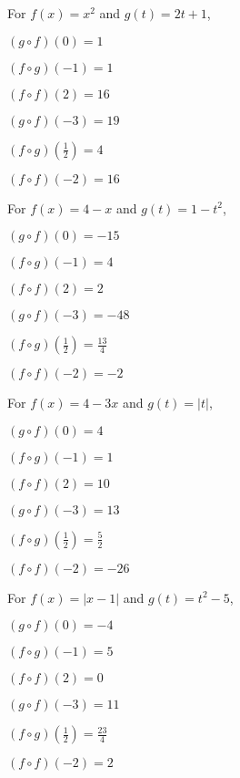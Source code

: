 \begin{exenum}

\item  For  $f(x) = x^2$ and $g(t) = 2t+1$,
\begin{shortitemize}[MMMMMMMMMMM]
\item  $(g\circ f)(0) = 1$
\item  $(f\circ g)(-1) = 1$
\item  $(f \circ f)(2) = 16$
\item  $(g\circ f)(-3) = 19$
\item  $(f\circ g)\left(\frac{1}{2}\right) = 4$
\item  $(f \circ f)(-2) = 16$
\end{shortitemize}

\item  For   $f(x) = 4-x$ and $g(t) = 1-t^2$,
\begin{shortitemize}[MMMMMMMMMMM]
\item  $(g\circ f)(0) = -15$
\item  $(f\circ g)(-1) = 4$
\item  $(f \circ f)(2) = 2$
\item  $(g\circ f)(-3) = -48$
\item  $(f\circ g)\left(\frac{1}{2}\right) = \frac{13}{4}$
\item  $(f \circ f)(-2) = -2$
\end{shortitemize}

\item  For   $f(x) = 4-3x$ and  $g(t) = |t|$,
\begin{shortitemize}[MMMMMMMMMMM]
\item  $(g\circ f)(0) = 4$
\item  $(f\circ g)(-1) = 1$
\item  $(f \circ f)(2) = 10$
\item  $(g\circ f)(-3) = 13$
\item  $(f\circ g)\left(\frac{1}{2}\right) = \frac{5}{2}$
\item  $(f \circ f)(-2) = -26$
\end{shortitemize}

\item  For   $f(x) = |x-1|$ and $g(t) = t^2-5$,
	\begin{shortitemize}[MMMMMMMMMMM]
\item  $(g\circ f)(0) = -4$
\item  $(f\circ g)(-1) = 5$
\item  $(f \circ f)(2) = 0$
\item  $(g\circ f)(-3) = 11$
\item  $(f\circ g)\left(\frac{1}{2}\right) = \frac{23}{4}$
\item  $(f \circ f)(-2) = 2$
\end{shortitemize}


\end{exenum}
